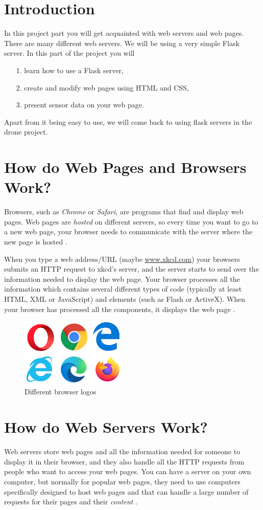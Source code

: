 \documentclass{article}
\begin{document}
\section{Introduction}
\noindent In this project part you will get acquainted with web servers and web pages. There are many different web servers. We will be using a very simple Flask server. In this part of the project you will
\begin{itemize}
\item[1.] learn how to use a Flask server,
\item[2.] create and modify web pages using HTML and CSS,
\item[3.] present sensor data on your web page.
\end{itemize}
Apart from it being easy to use, we will come back to using flask servers in the drone project.

\section{How do Web Pages and Browsers Work?}
Browsers, such as \emph{Chrome} or \emph{Safari}, are programs that find and display web pages. Web pages are \textit{hosted} on different servers, so every time you want to go to a new web page, your browser needs to communicate with the server where the new page is hosted \cite{web}. 

When you type a web address/URL (maybe \url{www.xkcd.com}) your browsers submits an HTTP request to xkcd's server, and the server starts to send over the information needed to display the web page. Your browser processes all the information which contains several different types of code (typically at least HTML, XML or JavaScript) and elements (such as Flash or ActiveX). When your browser has processed all the components, it displays the web page \cite{web}.
\begin{figure}[h]
    \centering
    \includegraphics[width=50mm]{brow.png}
    \caption{Different browser logos}
    \label{fig:logo2}
\end{figure}
\section{How do Web Servers Work?}
Web servers store web pages and all the information needed for someone to display it in their browser, and they also handle all the HTTP requests from people who want to access your web pages. You can have a server on your own computer, but normally for popular web pages, they need to use computers specifically designed to host web pages and that can handle a large number of requests for their pages and their \textit{content} \cite{serv}.
\end{document}
